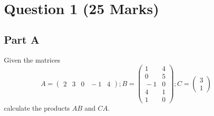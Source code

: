 \documentclass[12pt,a4paper]{article}
\begin{document}
\section*{Question 1 (25 Marks)}

\subsection*{Part A}
	Given the matrices 
	$$
	A=\left(\begin{array}{ccccc} 2&3&0&\!\!\!-1&4\end{array}\right); 
	B =\left(\begin{array}{cc} 1&4\\0&5\\\!\!\!-1&0\\4&1\\1&0\end{array}\right); 
	C=\left(\begin{array}{c} 3\\1\end{array}\right)
	$$
	calculate the products $AB$ and $CA$.
\end{document}
